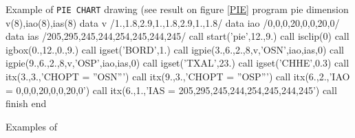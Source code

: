 \begin{XMPt}{Example of {\tt PIE CHART} drawing (see result on figure \ref{PIE}}
      program  pie 
      dimension v(8),iao(8),ias(8)
      data v /1.,1.8,2.9,1.,1.8,2.9,1.,1.8/
      data iao /0,0,0,20,0,0,20,0/
      data ias /205,295,245,244,254,245,244,245/
      call start('pie',12.,9.)
      call isclip(0)
      call igbox(0.,12.,0.,9.)
      call igset('BORD',1.)
      call igpie(3.,6.,2.,8,v,'OSN',iao,ias,0)
      call igpie(9.,6.,2.,8,v,'OSP',iao,ias,0)
      call igset('TXAL',23.)
      call igset('CHHE',0.3)
      call itx(3.,3.,'CHOPT = ''OSN''')
      call itx(9.,3.,'CHOPT = ''OSP''')
      call itx(6.,2.,'IAO = 0,0,0,20,0,0,20,0')
      call itx(6.,1.,'IAS = 205,295,245,244,254,245,244,245')
      call finish
      end
\end{XMPt}

\begin{Fighere}
\begin{center}
\mbox{}
\end{center}
\caption{Examples of \protect{}}
\label{PIE}
\end{Fighere}
\clearpage
 
